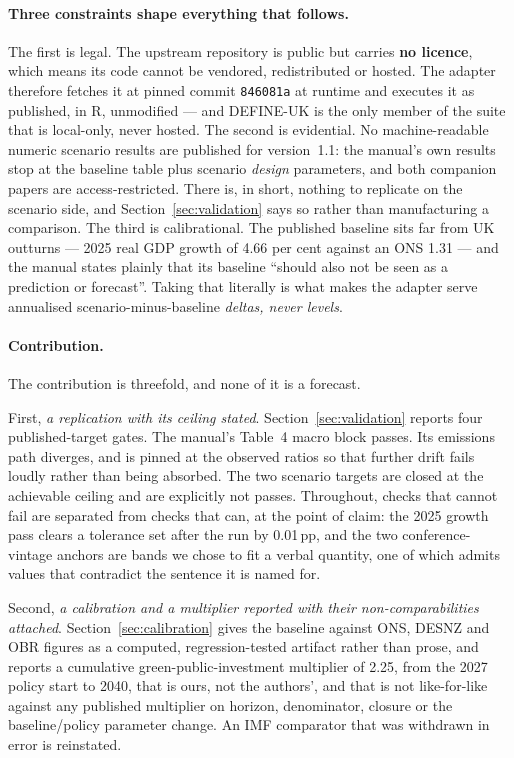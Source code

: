 \paragraph{Three constraints shape everything that follows.} The first is legal. The upstream repository is public but carries \textbf{no licence}, which means its code cannot be vendored, redistributed or hosted. The adapter therefore fetches it at pinned commit \texttt{846081a} at runtime and executes it as published, in R, unmodified --- and DEFINE-UK is the only member of the suite that is local-only, never hosted. The second is evidential. No machine-readable numeric scenario results are published for version~1.1: the manual's own results stop at the baseline table plus scenario \emph{design} parameters, and both companion papers are access-restricted. There is, in short, nothing to replicate on the scenario side, and Section~\ref{sec:validation} says so rather than manufacturing a comparison. The third is calibrational. The published baseline sits far from UK outturns --- 2025 real GDP growth of 4.66 per cent against an ONS 1.31 --- and the manual states plainly that its baseline ``should also not be seen as a prediction or forecast''. Taking that literally is what makes the adapter serve annualised scenario-minus-baseline \emph{deltas, never levels}.

\paragraph{Contribution.} The contribution is threefold, and none of it is a forecast.

First, \emph{a replication with its ceiling stated}. Section~\ref{sec:validation} reports four published-target gates. The manual's Table~4 macro block passes. Its emissions path diverges, and is pinned at the observed ratios so that further drift fails loudly rather than being absorbed. The two scenario targets are closed at the achievable ceiling and are explicitly not passes. Throughout, checks that cannot fail are separated from checks that can, at the point of claim: the 2025 growth pass clears a tolerance set after the run by 0.01\,pp, and the two conference-vintage anchors are bands we chose to fit a verbal quantity, one of which admits values that contradict the sentence it is named for.

Second, \emph{a calibration and a multiplier reported with their non-comparabilities attached}. Section~\ref{sec:calibration} gives the baseline against ONS, DESNZ and OBR figures as a computed, regression-tested artifact rather than prose, and reports a cumulative green-public-investment multiplier of 2.25, from the 2027 policy start to 2040, that is ours, not the authors', and that is not like-for-like against any published multiplier on horizon, denominator, closure or the baseline/policy parameter change. An IMF comparator that was withdrawn in error is reinstated.

